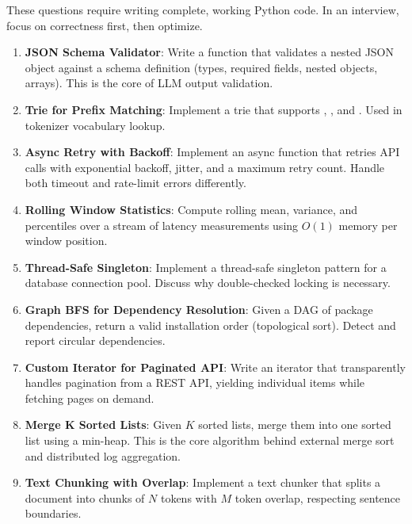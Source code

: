These questions require writing complete, working Python code. In an interview, focus on correctness first, then optimize.

\begin{enumerate}[leftmargin=*]
    \item[Q36.] \textbf{JSON Schema Validator}: Write a function that validates a nested JSON object against a schema definition (types, required fields, nested objects, arrays). This is the core of LLM output validation.

    \item[Q37.] \textbf{Trie for Prefix Matching}: Implement a trie that supports , , and . Used in tokenizer vocabulary lookup.

    \item[Q38.] \textbf{Async Retry with Backoff}: Implement an async function that retries API calls with exponential backoff, jitter, and a maximum retry count. Handle both timeout and rate-limit errors differently.

    \item[Q39.] \textbf{Rolling Window Statistics}: Compute rolling mean, variance, and percentiles over a stream of latency measurements using $O(1)$ memory per window position.

    \item[Q40.] \textbf{Thread-Safe Singleton}: Implement a thread-safe singleton pattern for a database connection pool. Discuss why double-checked locking is necessary.

    \item[Q41.] \textbf{Graph BFS for Dependency Resolution}: Given a DAG of package dependencies, return a valid installation order (topological sort). Detect and report circular dependencies.

    \item[Q42.] \textbf{Custom Iterator for Paginated API}: Write an iterator that transparently handles pagination from a REST API, yielding individual items while fetching pages on demand.

    \item[Q43.] \textbf{Merge K Sorted Lists}: Given $K$ sorted lists, merge them into one sorted list using a min-heap. This is the core algorithm behind external merge sort and distributed log aggregation.

    \item[Q44.] \textbf{Text Chunking with Overlap}: Implement a text chunker that splits a document into chunks of $N$ tokens with $M$ token overlap, respecting sentence boundaries.


\end{enumerate}
